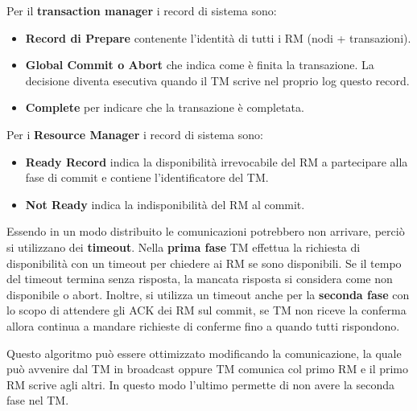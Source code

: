 Per il \textbf{transaction manager} i record di sistema sono:
\begin{itemize}
      \item \textbf{Record di Prepare} contenente l'identità di tutti i RM (nodi + transazioni).
      \item \textbf{Global Commit o Abort} che indica come è finita la transazione. La
            decisione diventa esecutiva quando il TM scrive nel proprio log
            questo record.
      \item \textbf{Complete} per indicare che la transazione è completata.
\end{itemize}
Per i \textbf{Resource Manager} i record di sistema sono:
\begin{itemize}
      \item \textbf{Ready Record} indica la disponibilità irrevocabile del RM a
            partecipare alla fase di commit e contiene l'identificatore del TM.
      \item \textbf{Not Ready} indica la indisponibilità del RM al commit.
\end{itemize}

Essendo in un modo distribuito le comunicazioni potrebbero non arrivare, perciò
si utilizzano dei \textbf{timeout}.
Nella \textbf{prima fase} TM effettua la richiesta di disponibilità con un timeout
per chiedere ai RM se sono disponibili. Se il tempo del timeout termina senza
risposta, la mancata risposta si considera come non disponibile
o abort. Inoltre, si utilizza un timeout anche per la \textbf{seconda fase} con lo
scopo di attendere gli ACK dei RM sul commit, se TM non riceve la conferma allora
continua a mandare richieste di conferme fino a quando tutti rispondono.

Questo algoritmo può essere ottimizzato modificando la comunicazione, la quale
può avvenire dal TM in broadcast oppure TM comunica col primo RM e il primo RM
scrive agli altri. In questo modo l'ultimo permette di non avere la seconda fase
nel TM.


